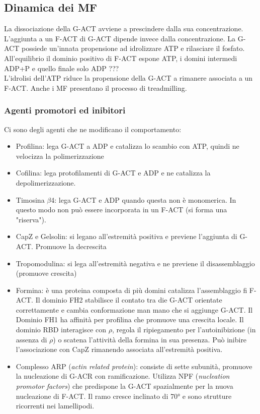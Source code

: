    \subsection{Dinamica dei MF}
        La dissociazione della G-ACT avviene a prescindere dalla sua concentrazione. L'aggiunta a un F-ACT di G-ACT dipende invece dalla concentrazione.
        La G-ACT possiede un'innata propensione ad idrolizzare ATP e rilasciare il fosfato. All'equilibrio il dominio positivo di F-ACT espone ATP, i domini intermedi ADP+P e quello finale solo ADP ???\\
        L'idrolisi dell'ATP riduce la propensione della G-ACT a rimanere associata a un F-ACT.
        Anche i MF presentano il processo di treadmilling.
            
        \subsubsection{Agenti promotori ed inibitori}
            Ci sono degli agenti che ne modificano il comportamento:
            \begin{itemize}
                \item Profilina: lega G-ACT a ADP e catalizza lo scambio con ATP, quindi ne velocizza la polimerizzazione
                \item Cofilina: lega protofilamenti di G-ACT e ADP e ne catalizza la depolimerizzazione.
                \item Timosina $\beta$4: lega G-ACT e ADP quando questa non è monomerica. In questo modo non può essere incorporata in un F-ACT (si forma una "riserva").
                \item CapZ e Gelsolin: si legano all'estremità positiva e previene l'aggiunta di G-ACT. Promuove la decrescita
                \item Tropomodulina: si lega all'estremità negativa e ne previene il disassemblaggio (promuove crescita)
                \item Formina: è una proteina composta di più domini catalizza l'assemblaggio fi F-ACT. Il dominio FH2 stabilisce il contato tra die G-ACT orientate correttamente e cambia conformazione man mano che si aggiunge G-ACT. Il Dominio FH1 ha affinità per profilina che promuove una crescita locale. Il dominio RBD interagisce con $\rho$, regola il ripiegamento per l'autoinibizione (in assenza di $\rho$) o scatena l'attività della formina in sua presenza.
                Può inibire l'associazione con CapZ rimanendo associata all'estremità positiva.
                \item Complesso ARP (\textit{actin related protein}): consiste di sette subunità, promuove la nucleazione di G-ACR con ramificazione. Utilizza NPF (\textit{nucleation promotor factors}) che predispone la G-ACT spazialmente per la nuova nucleazione di F-ACT. Il ramo cresce inclinato di 70° e sono strutture ricorrenti nei lamellipodi.
            \end{itemize}
